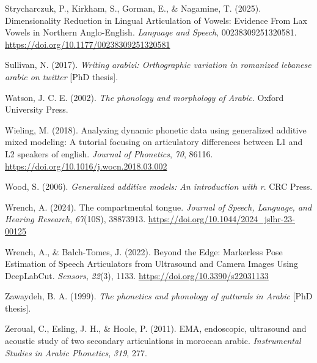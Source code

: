 \documentclass[
  man,
  longtable,
  nolmodern,
  notxfonts,
  notimes,
  colorlinks=true,linkcolor=blue,citecolor=blue,urlcolor=blue]{apa7}
\newlength{\cslhangindent}
\newenvironment{CSLReferences}[2] %
 {\begin{list}{}{%
  \setlength{\itemindent}{0pt}
  \setlength{\leftmargin}{0pt}
  \setlength{\parsep}{0pt}
  \ifodd #1
   \setlength{\leftmargin}{\cslhangindent}
   \setlength{\itemindent}{-1\cslhangindent}
  \fi
  \setlength{\itemsep}{#2\baselineskip}}}
 {\end{list}}
\begin{document}
\begin{CSLReferences}{1}{0}
Strycharczuk, P., Kirkham, S., Gorman, E., \& Nagamine, T. (2025).
Dimensionality Reduction in Lingual Articulation of Vowels: Evidence
From Lax Vowels in Northern Anglo-English. \emph{Language and Speech},
00238309251320581. \url{https://doi.org/10.1177/00238309251320581}

Sullivan, N. (2017). \emph{Writing arabizi: Orthographic variation in
romanized lebanese arabic on twitter} {[}PhD thesis{]}.

Watson, J. C. E. (2002). \emph{The phonology and morphology of Arabic}.
Oxford University Press.

Wieling, M. (2018). Analyzing dynamic phonetic data using generalized
additive mixed modeling: A tutorial focusing on articulatory differences
between L1 and L2 speakers of english. \emph{Journal of Phonetics},
\emph{70}, 86116. \url{https://doi.org/10.1016/j.wocn.2018.03.002}

Wood, S. (2006). \emph{Generalized additive models: An introduction with
r}. CRC Press.

Wrench, A. (2024). The compartmental tongue. \emph{Journal of Speech,
Language, and Hearing Research}, \emph{67}(10S), 38873913.
\url{https://doi.org/10.1044/2024_jslhr-23-00125}

Wrench, A., \& Balch-Tomes, J. (2022). Beyond the Edge: Markerless Pose
Estimation of Speech Articulators from Ultrasound and Camera Images
Using DeepLabCut. \emph{Sensors}, \emph{22}(3), 1133.
\url{https://doi.org/10.3390/s22031133}

Zawaydeh, B. A. (1999). \emph{The phonetics and phonology of gutturals
in Arabic} {[}PhD thesis{]}.

Zeroual, C., Esling, J. H., \& Hoole, P. (2011). EMA, endoscopic,
ultrasound and acoustic study of two secondary articulations in moroccan
arabic. \emph{Instrumental Studies in Arabic Phonetics}, \emph{319},
277.

\end{CSLReferences}
\end{document}
